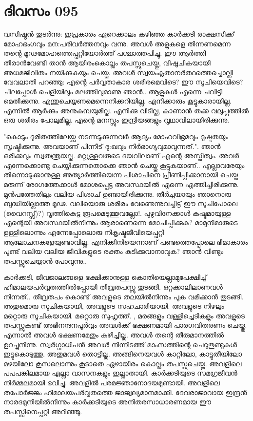 \newpage
\section{ദിവസം 095}


വസിഷ്ഠന്‍ തുടര്‍ന്നു: ഇപ്രകാരം ഏറെക്കാലം കഴിഞ്ഞ കാര്‍ക്കടി രാക്ഷസിക്ക്‌ മോഹഭംഗവും മന:പരിവര്‍ത്തനവും വന്നു. അവള്‍ അളുകളെ തിന്നണമെന്ന തന്റെ മൂഢമോഹത്തെപ്പറ്റിയോര്‍ത്ത്‌ പശ്ചാത്തപിച്ചു. ഈ ആര്‍ത്തി തീരാന്‍വേണ്ടി താന്‍ ആയിരംകൊല്ലം തപസ്സുചെയ്തു, വിഷൂചികയായി അധമജീവിതം നയിക്കുകയും ചെയ്തു. അവള്‍ സ്വയംകൃതാനര്‍ത്ഥത്തെച്ചൊല്ലി വേവലാതി പറഞ്ഞു: എന്റെ പര്‍വ്വതാകാര ശരീരമെവിടെ? ഈ സൂചിയെവിടെ? ചിലപ്പോള്‍ ചെളിയിലും മലത്തിലുമാണു ഞാന്‍.. ആളുകള്‍ എന്നെ ചവിട്ടി മെതിക്കുന്നു. എന്തുചെയ്യണമെന്നെനിക്കറിയില്ല. എനിക്കാരും കൂട്ടുകാരായില്ല. എന്നില്‍ ആര്‍ക്കും അനുകമ്പയുമില്ല. എനിക്കു  വീടില്ല, കാണാന്‍ തക്ക വലുപ്പത്തില്‍ ഒരു ശരീരം പോലുമില്ല. എന്റെ മനസ്സും ഇന്ദ്രിയങ്ങളും വൃഥാവിലായിരിക്കുന്നു. 

"കൊടും ദുരിതത്തിലേയ്ക്കു നടന്നടുക്കുന്നവര്‍ ആദ്യം മോഹവിഭ്രമവും ദുഷ്ടതയും സൃഷ്ടിക്കുന്നു. അവയാണ്‌ പിന്നീട്‌ ദു:ഖവും നിര്‍ഭാഗ്യവുമാവുന്നത്‌.". ഞാന്‍ ഒരിക്കലും സ്വതന്ത്രയല്ല. മറ്റുള്ളവരുടെ ദയവിലാണ്‌ എന്റെ അസ്തിത്വം. അവര്‍ എന്നേക്കൊണ്ടു ചെയ്യിക്കുന്നതൊക്കെ ഞാന്‍ ചെയ്തു കൂട്ടുകയാണ്‌.. എല്ലാവരേയും തിന്നൊടുക്കാനുള്ള അത്യാര്‍ത്തിയെന്ന പിശാചിനെ പ്രീണിപ്പിക്കാനായി ചെയ്ത മരുന്ന് രോഗത്തേക്കാള്‍ മോശപ്പെട്ട അവസ്ഥയില്‍ എന്നെ എത്തിച്ചിരിക്കുന്നു. മുന്‍പത്തേതിലും വലിയ പിശാച്‌ ഉണ്ടായിരിക്കുന്നു. തീര്‍ച്ചയായും ഞാനൊരു ബുദ്ധിയില്ലാത്ത മൂഢ. വലിയൊരു ശരീരം വേണ്ടെന്നുവച്ചിട്ട്‌ ഈ സൂചിപോലെ (വൈറസ്സ്‌)?)  വൃത്തികെട്ട രൂപമെടുത്തുവല്ലോ!. പുഴുവിനേക്കാള്‍ കഷ്ടമായുള്ള എന്റെയീ അവസ്ഥയില്‍നിന്നും ആരാണെന്നെ മോചിപ്പിക്കുക? മാമുനിമാരുടെ ഉള്ളിലൊന്നും എന്നേപ്പോലൊരു നികൃഷ്ടജീവിയെപ്പറ്റി ആലോചനകളേയുണ്ടാവില്ല. എനിക്കിനിയെന്നാണ്‌ പണ്ടത്തെപ്പോലെ ഭീമാകാരം പൂണ്ട്‌ വലിയ വലിയ ജീവികളുടെ രക്തം കുടിക്കുവാനാവുക? ഞാന്‍ വീണ്ടും തപസ്സുചെയ്യാന്‍ പോവുന്നു..

കാര്‍ക്കടി, ജീവജാലങ്ങളെ ഭക്ഷിക്കാനുള്ള കൊതിയെല്ലാമുപേക്ഷിച്ച്‌ ഹിമാലയപര്‍വ്വതത്തില്‍പ്പോയി തീവ്രതപസ്സു തുടങ്ങി. ഒറ്റക്കാലിലാണവള്‍ നിന്നത്‌.. തീവ്രതപം കൊണ്ട്‌ അവളുടെ തലയില്‍നിന്നും പുക വമിക്കാന്‍ തുടങ്ങി. അതുമൊരു സൂചികയായി, അവളുടെ സഹചാരിയായി. അവളുടെ നിഴലും മറ്റൊരു സൂചികയായി. മറ്റൊരു സുഹൃത്ത്‌. , മരങ്ങളും വള്ളിച്ചെടികളും അവളുടെ തപസ്സുകണ്ട്‌ അഭിനന്ദനപൂര്‍വ്വം അവള്‍ക്ക്‌ ഭക്ഷണമായി പാരഗവിതരണം ചെയ്തു. എന്നാല്‍ അവള്‍ ഭക്ഷണമേതും കഴിച്ചില്ല. അവള്‍ തന്റെ തീരുമാനത്തില്‍ ഉറച്ചുനിന്നു. സ്വര്‍ഗ്ഗാധിപന്‍ അവള്‍ നിന്നിടത്ത്‌ മാംസത്തിന്റെ ചെറുതുണ്ടുകള്‍ ഇട്ടുകൊടുത്തു. അതുമവള്‍ തൊട്ടില്ല. അങ്ങിനെയവള്‍ കാറ്റിലോ, കാട്ടുതീയിലോ മഴയിലോ കൂസലൊന്നും കൂടാതെ ഏഴായിരം കൊല്ലം തപസ്സുചെയ്തു. അവളിലെ പപപങ്കിലമായ എല്ലാ വാസനകളും ഇല്ലാതായി. കാര്‍ക്കടിയുടെ സമഗ്രജീവന്‍ നിര്‍മ്മലമായി ഭവിച്ചു. അവളില്‍ പരമജ്ഞാനോദയമുണ്ടായി. അവളിലെ തപോര്‍ജ്ജം ഹിമാലയപര്‍വ്വതത്തെ ജാജ്വല്യമാനമാക്കി. ദേവരാജാവായ ഇന്ദ്രന്‍ നാരദമുനിയില്‍നിന്നും കാര്‍ക്കടിയുടെ അനിതരസാധാരണമായ ഈ തപസ്സിനെപ്പറ്റി അറിഞ്ഞു.

